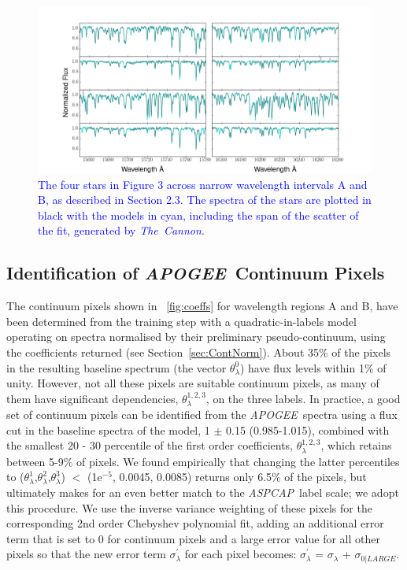 \documentclass[12pt, preprint]{aastex}
\newcommand{\sectionname}{Section}
\newcommand{\tc}{\textsl{The~Cannon}}
\newcommand{\apogee}{\textsl{APOGEE}}
\newcommand{\aspcap}{\textsl{ASPCAP}}
\begin{document}
\begin{figure}[!h]
\centering
 \includegraphics[scale=0.4]{./plots/aftersubmit/data_model_cyan.png}
\caption{\textcolor{blue}{The four stars in Figure 3 across narrow wavelength intervals A and B, as described in Section 2.3. The spectra of the stars are plotted in black with the models in cyan, including the span of the scatter of the fit, generated by \tc.}}
\label{fig:modeldata}
\end{figure}



\subsection{Identification of \apogee\ Continuum Pixels}
\label{sec:ApogeeContinuum}


The continuum pixels shown in \figurename~\ref{fig:coeffs} for wavelength regions A and B, 
have been determined from the training step with a quadratic-in-labels model operating on spectra normalised by their preliminary pseudo-continuum, using the coefficients returned (see \sectionname~\ref{sec:ContNorm}). About 35\% of the pixels in the resulting baseline spectrum  (the vector $\theta^0_\lambda$) have flux levels within 1\% of unity. However, not all these pixels are suitable continuum pixels, as many of them have significant dependencies,  $\theta^{1,2,3}_\lambda$,  on the three labels. In practice, a good set of continuum pixels can be identified from the \apogee\ spectra using a flux cut in the baseline spectra of the model, 1 $\pm$ 0.15 (0.985-1.015), combined with the smallest 20 - 30 percentile of the first order coefficients, $\theta^{1,2,3}_\lambda$,  which retains between 5-9\% of pixels. We found empirically that changing the latter percentiles to ($\theta^{1}_\lambda$,$\theta^{2}_\lambda$,$\theta^{3}_\lambda$) $<$ (1e$^{-5}$, 0.0045, 0.0085) returns only 6.5\% of the pixels, but ultimately makes for an even  better match to the \aspcap\ label scale; we adopt this procedure. We use the inverse variance weighting of these pixels for the corresponding 2nd order Chebyshev polynomial fit, adding an additional error term that is set to 0 for continuum pixels and a large error value for all other pixels so that the new error term $\sigma^{'}_\lambda$ for each pixel becomes:
$\sigma^{'}_\lambda$ = $\sigma_\lambda$ + $\sigma_{0|LARGE}$. 
\end{document}
